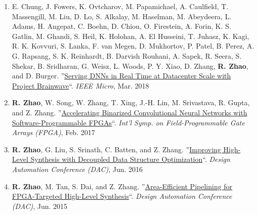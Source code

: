 \documentclass[11pt,a4paper,roman]{moderncv}        %
\newcommand{\BF}[1]{\textbf{#1}}
\newcommand{\IT}[1]{\textit{#1}}
\newcommand{\UL}[1]{\uline{#1}}
\newcommand*{\customcvpub}[5][.5em]{
  {#2 ''\UL{#3}``. \IT{#4}, #5}
  \par\addvspace{#1}
}
\begin{document}
\begin{minipage}{\maincolumnwidth}
{\begin{enumerate}
        \item \customcvpub{E. Chung, J. Fowers, K. Ovtcharov, M. Papamichael, A. Caulfield, T. Massengill, M. Liu, D. Lo, S. Alkalay, M. Haselman, M. Abeydeera, L. Adams, H. Angepat, C. Boehn, D. Chiou, O. Firestein, A. Forin, K. S. Gatlin, M. Ghandi, S. Heil, K. Holohan, A. El Husseini, T. Juhasz, K. Kagi, R. K. Kovvuri, S. Lanka, F. van Megen, D. Mukhortov, P. Patel, B. Perez, A. G. Rapsang, S. K. Reinhardt, B. Darvish Rouhani, A. Sapek, R. Seera, S. Shekar, B. Sridharan, G. Weisz, L. Woods, P. Y. Xiao, D. Zhang, \BF{R. Zhao}, and D. Burger.}{Serving DNNs in Real Time at Datacenter Scale with Project Brainwave}{IEEE Micro}{Mar. 2018}
        \item \customcvpub{\BF{R. Zhao}, W. Song, W. Zhang, T. Xing, J.-H. Lin, M. Srivastava, R. Gupta, and Z. Zhang.}{Accelerating Binarized Convolutional Neural Networks with Software-Programmable FPGAs}{Int’l Symp. on Field-Programmable Gate Arrays (FPGA)}{Feb. 2017}
        \item \customcvpub{\BF{R. Zhao}, G. Liu, S. Srinath, C. Batten, and Z. Zhang.}{Improving High-Level Synthesis with Decoupled Data Structure Optimization}{Design Automation Conference (DAC)}{Jun. 2016}
        \item \customcvpub{\BF{R. Zhao}, M. Tan, S. Dai, and Z. Zhang.}{Area-Efficient Pipelining for FPGA-Targeted High-Level Synthesis}{Design Automation Conference (DAC)}{Jun. 2015}
    \end{enumerate}
    }
\end{minipage}%
\end{document}

